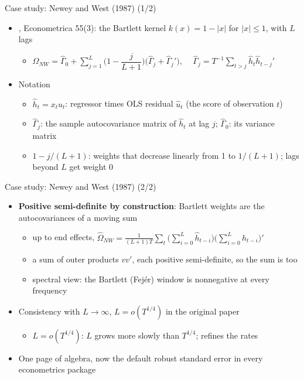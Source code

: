 \begin{frame}{Case study: Newey and West (1987) (1/2)}
\itemsize{\small}
\begin{itemize}
    \item {}, Econometrica 55(3): the Bartlett kernel $k(x) = 1 - |x|$ for $|x| \le 1$, with $L$ lags
    \begin{itemize}
        \item $\hat\Omega_{NW} = \hat\Gamma_0 + \sum_{j=1}^{L}\Big(1 - \dfrac{j}{L+1}\Big)\big(\hat\Gamma_j + \hat\Gamma_j'\big)$, $\quad\hat\Gamma_j = T^{-1}\sum_{t>j}\hat h_t\hat h_{t-j}'$
    \end{itemize}
    \item Notation
    \begin{itemize}
        \item $\hat h_t = x_t\hat u_t$: regressor times OLS residual $\hat u_t$ (the score of observation $t$)
        \item $\hat\Gamma_j$: the sample autocovariance matrix of $\hat h_t$ at lag $j$; $\hat\Gamma_0$: its variance matrix
        \item $1 - j/(L+1)$: weights that decrease linearly from 1 to $1/(L+1)$; lags beyond $L$ get weight 0
    \end{itemize}
\end{itemize}
\end{frame}

\begin{frame}{Case study: Newey and West (1987) (2/2)}
\itemsize{\small}
\begin{itemize}
    \item \textbf{Positive semi-definite by construction}: Bartlett weights are the autocovariances of a moving sum
    \begin{itemize}
        \item up to end effects, $\hat\Omega_{NW} = \frac{1}{(L+1)T}\sum_t\big(\sum_{i=0}^{L}\hat h_{t-i}\big)\big(\sum_{i=0}^{L}\hat h_{t-i}\big)'$
        \item a sum of outer products $vv'$, each positive semi-definite, so the sum is too
        \item spectral view: the Bartlett (Fejér) window is nonnegative at every frequency
    \end{itemize}
    \item Consistency with $L \to \infty$, $L = o(T^{1/4})$ in the original paper
    \begin{itemize}
        \item $L = o(T^{1/4})$: $L$ grows more slowly than $T^{1/4}$;  refines the rates
    \end{itemize}
    \item One page of algebra, now the default robust standard error in every econometrics package
\end{itemize}
\end{frame}

